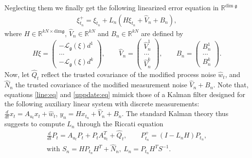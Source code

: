 \documentclass[a4paper,12pt,onecolumn]{article}
\newcommand{\RR}{{\mathbb{R}}}
\newcommand{\dotex}{{\frac{d}{dt}}}
\begin{document}
Neglecting them  we finally get the following linearized error equation in $\RR^{\text{dim }\mathfrak{g}}$
\begin{align}
\xi_{t_n}^+ = \xi_{t_n} + L_n \left( H \xi_{t_n} + \hat{V}_n + B_n \right),\label{uppdate:eq}
\end{align}
where $H\in\RR^{kN\times\mathrm{dim}\mathfrak{g}}$, $\hat V_n\in\RR^{kN}$ and $ B_n\in\RR^{kN}$  are defined by
$$H\xi=
\begin{pmatrix}
-\mathcal{L}_{\mathfrak{g}}(\xi) d^1  \\
... \\
-\mathcal{L}_{\mathfrak{g}}(\xi) d^k  
\end{pmatrix}
,\qquad \hat V_n=
\begin{pmatrix}
\hat V_n^1 \\
... \\
\hat V_n^k
\end{pmatrix}
,\qquad B_n=
\begin{pmatrix}
 B_n^1 \\
... \\
 B_n^k
\end{pmatrix}.
$$
Now, let $\hat{Q}_t$ reflect the trusted covariance of the modified process noise $\hat w_t$, and $\hat{N}_n$ the trusted covariance of the modified measurement noise $\hat{V}_n + B_n$.  
Note that, equations \eqref{line:eq} and \eqref{uppdate:eq} mimick those of a Kalman filter designed for the following auxiliary linear  system with discrete measurements: $\dotex x_t=A_{u_t} x_t + \hat{w}_t$, $y_n=H x_{t_n}+\hat{V}_n + B_n$. The standard Kalman theory thus suggests to compute $L_n$ through the Riccati equation 
\begin{equation}
\label{Kgains:eq}\begin{gathered}
\frac{d}{dt} P_t  = A_{u_t} P_t + P_t A_{u_t}^T +\hat{Q}_t , \qquad P_{t_n}^+  = (I-L_n H) P_{t_n},
\\ \text{with }  
S_n  = H P_{t_n} H^T + \hat{N}_n ,~
L_n  = P_{t_n} H^T S^{-1}.\end{gathered}
\end{equation}
\end{document}
